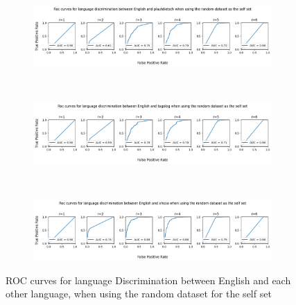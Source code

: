 \documentclass{article}
\begin{document}
\begin{figure}[ht]
\begin{subfigure}[t]{\linewidth}
        \label{fig:eng_mid_eng_rnd}
    \end{subfigure}
    \\
    \begin{subfigure}[t]{\linewidth}
        \centering
        \includegraphics[width=\linewidth]{images/english_platudietsch_random.png}
        \label{fig:eng_mid_pla_rnd}
    \end{subfigure}
    \\
    \begin{subfigure}[t]{\linewidth}
        \centering
        \includegraphics[width=\linewidth]{images/english_tagalog_random.png}
        \label{fig:eng_mid_tag_rnd}
    \end{subfigure}
        \\
    \begin{subfigure}[t]{\linewidth}
        \centering
        \includegraphics[width=\linewidth]{images/english_xhosa_random.png}
        \label{fig:eng_xho_rnd}
    \end{subfigure}
    
    \caption{ROC curves for language Discrimination between English and each other language, when using the random dataset for the self set}
    \label{fig:langs_random}
\end{figure}
\end{document}

